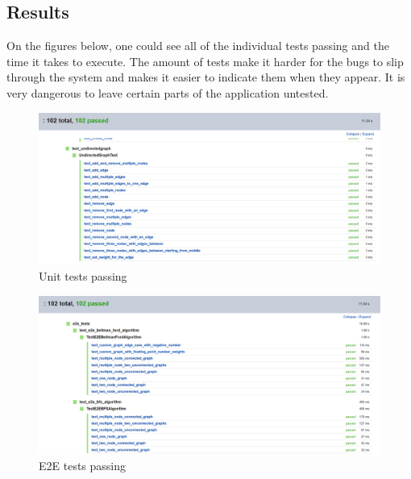 \subsection{Results}

On the figures below, one could see all of the individual tests passing and the time it takes to execute. The amount of tests make it harder for the bugs to slip through the system and makes it easier to indicate them when they appear. It is very dangerous to leave certain parts of the application untested.

\begin{figure}[H]
	\centering
	\includegraphics[width=\textwidth]{images/tests_pass.png}
	\caption{Unit tests passing}
\end{figure}

\begin{figure}[H]
	\centering
	\includegraphics[width=\textwidth]{images/e2e_tests_pass.png}
	\caption{E2E tests passing}
\end{figure}